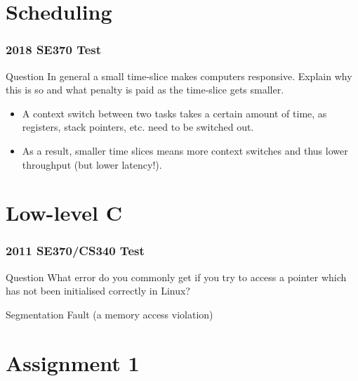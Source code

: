 \documentclass{beamer}
\begin{document}
\section{Scheduling}
\begin{frame}
  \frametitle{2018 SE370 Test}
  \begin{block}{Question}
    In general a small time-slice makes computers responsive. Explain why this is so and what penalty is paid as the time-slice gets smaller.
  \end{block}
  \pause
  \begin{itemize}
    \item A context switch between two tasks takes a certain amount of time, as registers, stack pointers, etc. need to be switched out.
    \item As a result, smaller time slices means more context switches and thus lower throughput (but lower latency!).
  \end{itemize}
\end{frame}
\section{Low-level C}
\begin{frame}
  \frametitle{2011 SE370/CS340 Test}
  \begin{block}{Question}
    What error do you commonly get if you try to access a pointer which has not been initialised correctly in Linux?
  \end{block}
  \pause
  Segmentation Fault (a memory access violation)
\end{frame}
\section{Assignment 1}
\end{document}
